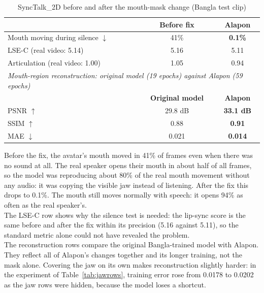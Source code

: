 \begin{table}[H]
    \centering
    \caption{SyncTalk\_2D before and after the mouth-mask change (Bangla test clip)}
    \label{tab:maskfix}
    \renewcommand{\arraystretch}{1.3}
    \begin{tabular}{lcc}
        \hline
        & \textbf{Before fix} & \textbf{Alapon} \\
        \hline
        Mouth moving during silence $\downarrow$ & 41\% & \textbf{0.1\%} \\
        LSE-C (real video: 5.14) & 5.16 & 5.11 \\
        Articulation (real video: 1.00) & 1.05 & 0.94 \\
        \hline
        \multicolumn{3}{l}{\textit{Mouth-region reconstruction: original model (19 epochs) against Alapon (59 epochs)}} \\
        \hline
        & \textbf{Original model} & \textbf{Alapon} \\
        \hline
        PSNR $\uparrow$ & 29.8 dB & \textbf{33.1 dB} \\
        SSIM $\uparrow$ & 0.88 & \textbf{0.91} \\
        MAE $\downarrow$ & 0.021 & \textbf{0.014} \\
        \hline
    \end{tabular}
\end{table}

\noindent
Before the fix, the avatar's mouth moved in 41\% of frames even when there was no sound at all. The real speaker opens their mouth in about half of all frames, so the model was reproducing about 80\% of the real mouth movement without any audio: it was copying the visible jaw instead of listening. After the fix this drops to 0.1\%. The mouth still moves normally with speech: it opens 94\% as often as the real speaker's.\\

\noindent
The LSE-C row shows why the silence test is needed: the lip-sync score is the same before and after the fix within its precision (5.16 against 5.11), so the standard metric alone could not have revealed the problem.\\

\noindent
The reconstruction rows compare the original Bangla-trained model with Alapon. They reflect all of Alapon's changes together and its longer training, not the mask alone. Covering the jaw on its own makes reconstruction slightly harder: in the experiment of Table~\ref{tab:jawrows}, training error rose from 0.0178 to 0.0202 as the jaw rows were hidden, because the model loses a shortcut.\\

